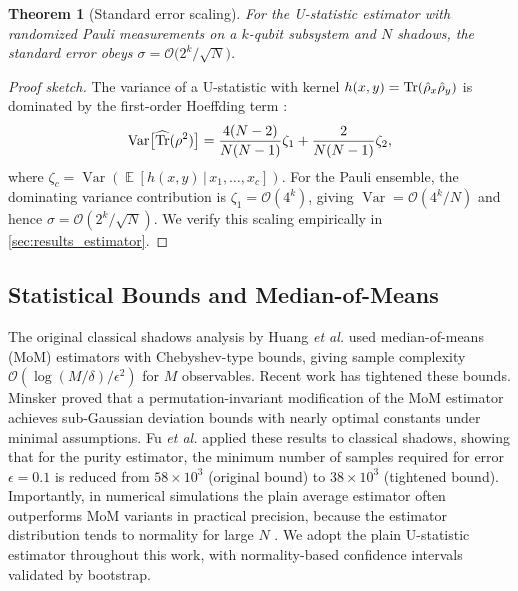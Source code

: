 \documentclass[12pt,a4paper,oneside]{book}
\theoremstyle{plain}
\newtheorem{theorem}{Theorem}[chapter]
\theoremstyle{definition}
\theoremstyle{remark}
\DeclareMathOperator{\Var}{Var}
\DeclareMathOperator{\E}{\mathbb{E}}
\begin{document}
\begin{theorem}[Standard error scaling]\label{thm:std_error}
For the U-statistic estimator with randomized Pauli measurements on a $k$-qubit subsystem and $N$ shadows, the standard error obeys $\sigma = \mathcal{O}\bigl(2^k / \sqrt{N}\bigr)$.
\end{theorem}

\begin{proof}[Proof sketch]
The variance of a U-statistic with kernel $h(x,y) = \Tr(\hat{\rho}_x \hat{\rho}_y)$ is dominated by the first-order Hoeffding term \cite{hoeffding1948class}:
\begin{equation}
    \Var\bigl[\widehat{\Tr}(\rho^2)\bigr] = \frac{4(N-2)}{N(N-1)}\zeta_1 + \frac{2}{N(N-1)}\zeta_2,
\end{equation}
where $\zeta_c = \Var(\E[h(x,y) \,|\, x_1,\dots,x_c])$. For the Pauli ensemble, the dominating variance contribution is $\zeta_1 = \mathcal{O}(4^k)$, giving $\Var = \mathcal{O}(4^k/N)$ and hence $\sigma = \mathcal{O}(2^k/\sqrt{N})$. We verify this scaling empirically in \cref{sec:results_estimator}.
\end{proof}

\subsection{Statistical Bounds and Median-of-Means}

The original classical shadows analysis by Huang \textit{et al.} \cite{huang2020predicting} used median-of-means (MoM) estimators with Chebyshev-type bounds, giving sample complexity $\mathcal{O}(\log(M/\delta)/\epsilon^2)$ for $M$ observables. Recent work has tightened these bounds. Minsker \cite{minsker2023efficient} proved that a permutation-invariant modification of the MoM estimator achieves sub-Gaussian deviation bounds with nearly optimal constants under minimal assumptions. Fu \textit{et al.} \cite{fu2025classical} applied these results to classical shadows, showing that for the purity estimator, the minimum number of samples required for error $\epsilon = 0.1$ is reduced from $58 \times 10^3$ (original bound) to $38 \times 10^3$ (tightened bound). Importantly, in numerical simulations the plain average estimator often outperforms MoM variants in practical precision, because the estimator distribution tends to normality for large $N$ \cite{fu2025classical}. We adopt the plain U-statistic estimator throughout this work, with normality-based confidence intervals validated by bootstrap.
\end{document}
